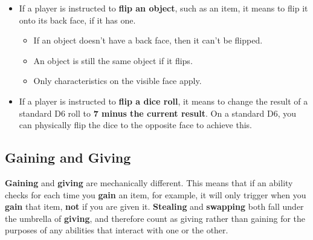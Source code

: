 \documentclass[10pt, a4paper, twoside]{article} %
\begin{document}
    \begin{itemize}
        \item If a player is instructed to \textbf{flip an object}, such as an item, it means to flip it onto its back face, if it has one.
        \begin{itemize}
            \item If an object doesn’t have a back face, then it can’t be flipped.
            \item An object is still the same object if it flips.
            \item Only characteristics on the visible face apply.
        \end{itemize}
        \item If a player is instructed to \textbf{flip a dice roll}, it means to change the result of a standard D6 roll to \textbf{7 minus the current result}. On a standard D6, you can physically flip the dice to the opposite face to achieve this.
    \end{itemize}
    \subsection{Gaining and Giving}
    \label{gaining}
    \textbf{Gaining} and \textbf{giving} are mechanically different. This means that if an ability checks for each time you \textbf{gain} an item, for example, it will only trigger when you \textbf{gain} that item, \textbf{not} if you are given it. \textbf{Stealing} and \textbf{swapping} both fall under the umbrella of \textbf{giving}, and therefore count as giving rather than gaining for the purposes of any abilities that interact with one or the other.
\end{document}
